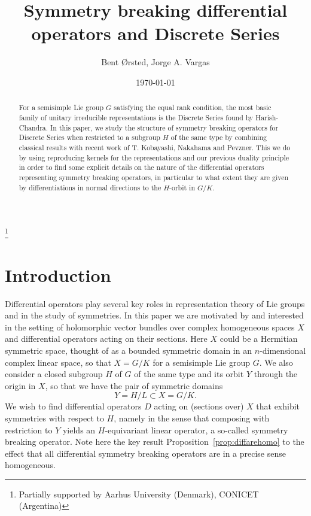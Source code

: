 \documentclass[12pt]{amsart}
\theoremstyle{definition}
\theoremstyle{remark}
\numberwithin{equation}{section}
\begin{document}
 \title{ Symmetry breaking differential operators and Discrete Series}
\author{  Bent {\O}rsted,   Jorge A.  Vargas}
\thanks{Partially supported by Aarhus University  (Denmark),  CONICET
(Argentina)  }
\date{\today }
 \address{ Mathematics Department, Aarhus University, Denmark; FAMAF-CIEM, Ciudad Universitaria, 5000 C\'ordoba, Argentine}

\begin{abstract}
For a semisimple Lie group $G$ satisfying the
equal rank condition, the most basic family of unitary
irreducible representations is the Discrete Series found
by Harish-Chandra. In this paper, we study the structure of symmetry breaking operators  for Discrete Series when restricted to a subgroup
$H$ of the same type by combining classical results
with recent work of T. Kobayashi, Nakahama and Pevzner. This we do by using reproducing
kernels for the representations and our previous duality principle in order to find some explicit
details on the nature of the differential operators representing symmetry breaking operators,
in particular to what extent  they are given by differentiations in normal directions to the $H$-orbit in $G/K$.
\end{abstract}
\maketitle
{}


\tableofcontents
\section{Introduction}


 Differential operators play several key roles in representation theory of Lie groups and in the study of
symmetries. In this paper we are motivated by and interested in the setting of holomorphic vector bundles
over complex homogeneous spaces $X$ and differential operators acting on their sections. Here $X$
could be a Hermitian symmetric space, thought of as a bounded symmetric domain in an $n$-dimensional
complex linear space, so that $X = G/K$ for a semisimple Lie group $G$. We also consider a closed subgroup
$H$ of $G$ of the same type and its orbit $Y$ through the origin in $X$, so that we have the pair of symmetric domains
$$Y = H/L \subset X = G/K. $$
We wish to find differential operators $D$ acting on (sections over) $X$ that exhibit symmetries with respect to $H$,
namely in the sense that composing with restriction to $Y$ yields an $H$-equivariant linear operator, a
so-called symmetry breaking operator. Note here the key result Proposition~\ref{prop:diffarehomo} to the effect that all differential
symmetry breaking operators are in a precise sense homogeneous.
\end{document}
